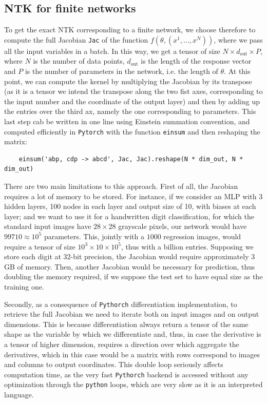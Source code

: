 \documentclass[11pt,notitlepage]{article}
\numberwithin{equation}{section}
\theoremstyle{remark}
\theoremstyle{definition}
\begin{document}
	\subsection{NTK for finite networks}\label{subsec:finiteImpl}
	To get the exact NTK corresponding to a finite network, we choose therefore to compute the full Jacobian \verb|Jac| of the function $f(\theta, (x^1, \dots, x^N))$, where we pass all the input variables in a batch.
	In this way, we get a tensor of size $N \times d_\text{out} \times P$, where $N$ is the number of data points, $d_\text{out}$ is the length of the response vector and $P$ is the number of parameters in the network, i.e. the length of $\theta$.
	At this point, we can compute the kernel by multiplying the Jacobian by its transpose (as it is a tensor we intend the transpose along the two fist axes, corresponding to the input number and the coordinate of the output layer) and then by adding up the entries over the third ax, namely the one corresponding to parameters.
	This last step cab be written in one line using Einstein summation convention, and computed efficiently in \verb|Pytorch| with the function \verb|einsum| and then reshaping the matrix:
	\begin{verbatim}
	einsum('abp, cdp -> abcd', Jac, Jac).reshape(N * dim_out, N * dim_out)
	\end{verbatim}
	
	There are two main limitations to this approach.
	First of all, the Jacobian requires a lot of memory to be stored.
	For instance, if we consider an MLP with 3 hidden layers, 100 nodes in each layer and output size of 10, with biases at each layer; and we want to use it for a handwritten digit classification, for which the standard input images have $28 \times 28$ grayscale pixels, our network would have $99710 \approx 10^5$ parameters.
	This, jointly with a $1000$ regression images, would require a tensor of size $10^3 \times 10 \times 10^5$, thus with a billion entries.
	Supposing we store each digit at 32-bit precision, the Jacobian would require approximately $3$GB of memory.
	Then, another Jacobian would be necessary for prediction, thus doubling the memory required, if we suppose the test set to have equal size as the training one.
	
	Secondly, as a consequence of \verb|Pythorch| differentiation implementation, to retrieve the full Jacobian we need to iterate both on input images and on output dimensions.
	This is because differentiation always return a tensor of the same shape as the variable by which we differentiate and, thus, in case the derivative is a tensor of higher dimension, requires a direction over which aggregate the derivatives, which in this case would be a matrix with rows correspond to images and columns to output coordinates.
	This double loop seriously affects computation time, as the very fast \verb|Pythorch| backend is accessed without any optimization through the \verb|python| loops, which are very slow as it is an interpreted language.
	
\end{document}
